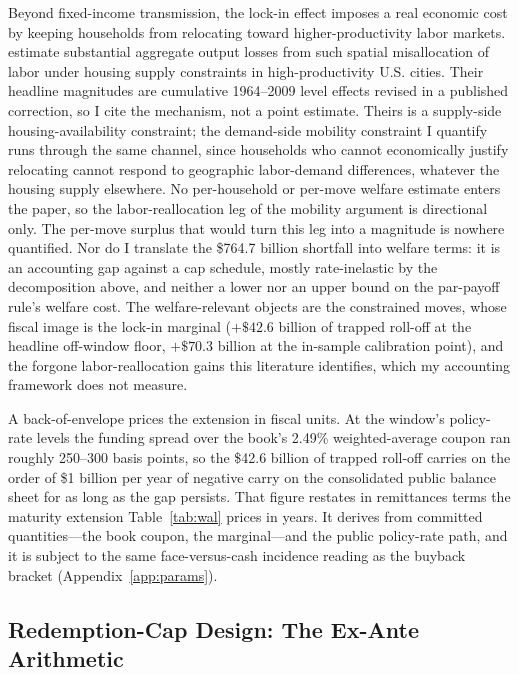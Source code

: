 \documentclass[12pt]{article}
\begin{document}
Beyond fixed-income transmission, the lock-in effect imposes a real economic cost by keeping households from relocating toward higher-productivity labor markets. \citet{hsieh2019} estimate substantial aggregate output losses from such spatial misallocation of labor under housing supply constraints in high-productivity U.S. cities. Their headline magnitudes are cumulative 1964--2009 level effects revised in a published correction, so I cite the mechanism, not a point estimate. Theirs is a supply-side housing-availability constraint; the demand-side mobility constraint I quantify runs through the same channel, since households who cannot economically justify relocating cannot respond to geographic labor-demand differences, whatever the housing supply elsewhere. No per-household or per-move welfare estimate enters the paper, so the labor-reallocation leg of the mobility argument is directional only. The per-move surplus that would turn this leg into a magnitude is nowhere quantified. Nor do I translate the \$764.7 billion shortfall into welfare terms: it is an accounting gap against a cap schedule, mostly rate-inelastic by the decomposition above, and neither a lower nor an upper bound on the par-payoff rule's welfare cost. The welfare-relevant objects are the constrained moves, whose fiscal image is the lock-in marginal ($+\$42.6$ billion of trapped roll-off at the headline off-window floor, $+\$70.3$ billion at the in-sample calibration point), and the forgone labor-reallocation gains this literature identifies, which my accounting framework does not measure.

A back-of-envelope prices the extension in fiscal units. At the window's policy-rate levels the funding spread over the book's 2.49\% weighted-average coupon ran roughly 250--300 basis points, so the \$42.6 billion of trapped roll-off carries on the order of \$1 billion per year of negative carry on the consolidated public balance sheet for as long as the gap persists. That figure restates in remittances terms the maturity extension Table~\ref{tab:wal} prices in years. It derives from committed quantities---the book coupon, the marginal---and the public policy-rate path, and it is subject to the same face-versus-cash incidence reading as the buyback bracket (Appendix~\ref{app:params}).

\subsection{Redemption-Cap Design: The Ex-Ante Arithmetic}\label{sec:discussion-capdesign}
\end{document}
